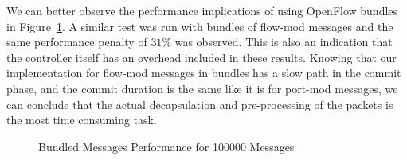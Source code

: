 We can better observe the performance implications of using OpenFlow bundles in Figure~\ref{fig:bundleperf}.
A similar test was run with bundles of flow-mod messages and the same performance penalty of $31\%$ was observed.
This is also an indication that the controller itself has an overhead included in these results. Knowing that
our implementation for flow-mod messages in bundles has a slow path in the commit phase, and the commit duration
is the same like it is for port-mod messages, we can conclude that the actual decapsulation and pre-processing
of the packets is the most time consuming task.

\begin{figure}[h]
  \begin{center}
    \caption{Bundled Messages Performance for 100000 Messages}
    \label{fig:bundleperf}
  \end{center}
\end{figure}
